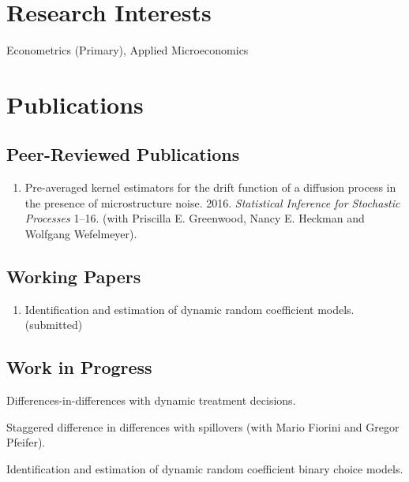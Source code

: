 \documentclass[10pt,letterpaper]{article}
\renewenvironment{itemize}{
  \begin{list}{}{
      \setlength{\leftmargin}{1.5em}
      \setlength{\itemsep}{0.25em}
      \setlength{\parskip}{0pt}
      \setlength{\parsep}{0.25em}
    }
}{
  \end{list}
}
\begin{document}
\section*{Research Interests}

Econometrics (Primary), Applied Microeconomics

\section*{Publications}

\subsection*{Peer-Reviewed Publications}

\begin{enumerate}
\item
  Pre-averaged kernel estimators for the drift function of a diffusion process in the presence of microstructure noise. 
  2016.
  \textit{Statistical Inference for Stochastic Processes} 1--16.
  (with Priscilla E. Greenwood, Nancy E. Heckman and Wolfgang Wefelmeyer).
\end{enumerate}

\subsection*{Working Papers}

\begin{enumerate}[resume]
\item Identification and estimation of dynamic random coefficient models. (submitted)
\end{enumerate}

\subsection*{Work in Progress}

\begin{itemize}
\item Differences-in-differences with dynamic treatment decisions.
\item Staggered difference in differences with spillovers (with Mario Fiorini and Gregor Pfeifer).
\item Identification and estimation of dynamic random coefficient binary choice models.
\end{itemize}
\end{document}
